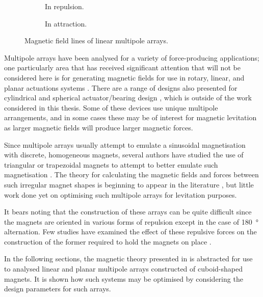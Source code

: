 \documentclass[11pt,a4paper]{memoir}
\begin{document}
\begin{figure}
\begin{wide}
  \begin{subfigure}
  \texttt{[image: PhD/Figures/Multipole/2-halb-repl]}
  \caption{In repulsion.}
  \end{subfigure}\hfil
\begin{subfigure}
  \texttt{[image: PhD/Figures/Multipole/2-halb-attr]}
  \caption{In attraction.}
\end{subfigure}
\end{wide}
\caption{Magnetic field lines of linear multipole arrays.}
\end{figure}

Multipole arrays have been analysed for a variety of force-producing applications; one particularly area that has received significant attention that will not be considered here is for generating magnetic fields for use in rotary, linear, and planar actuations systems \parencite{marinescu1992,trumper1993-ieia-conf,cho2001,zhu2001-ipep,lee2004-mx,jang2005a,jang2005b,kimoulakis2008,lee2006-mx,min2010-ietm}.
There are a range of designs also presented for cylindrical and spherical actuator/bearing design \cite{zhu2001-ipep,yan2006-iemx,xia2008-ietm}, which is outside of the work considered in this thesis.
Some of these devices use unique multipole arrangements, and in some cases these may be of interest for magnetic levitation as larger magnetic fields will produce larger magnetic forces.

Since multipole arrays usually attempt to emulate a sinusoidal magnetisation with discrete, homogeneous magnets, several authors have studied the use of triangular or trapezoidal magnets to attempt to better emulate such magnetisation \cite{cho2001,lee2006-mx,choi2008,meessen2008-ietm,marble2008-ietm}.
The theory for calculating the magnetic fields and forces between such irregular magnet shapes is beginning to appear in the literature \cite{janssen2009-ietm}, but little work done yet on optimising such multipole arrays for levitation purposes.

It bears noting that the construction of these arrays can be quite difficult since the magnets are oriented in various forms of repulsion except in the case of \SI{180}{\degree} alternation.
Few studies have examined the effect of these repulsive forces on the construction of the former required to hold the magnets on place \cite{rovers2009-ietm}.

In the following sections, the magnetic theory presented in  is abstracted for use to analysed linear and planar multipole arrays constructed of cuboid-shaped magnets.
It is shown how such systems may be optimised by considering the design parameters for such arrays.
\end{document}
